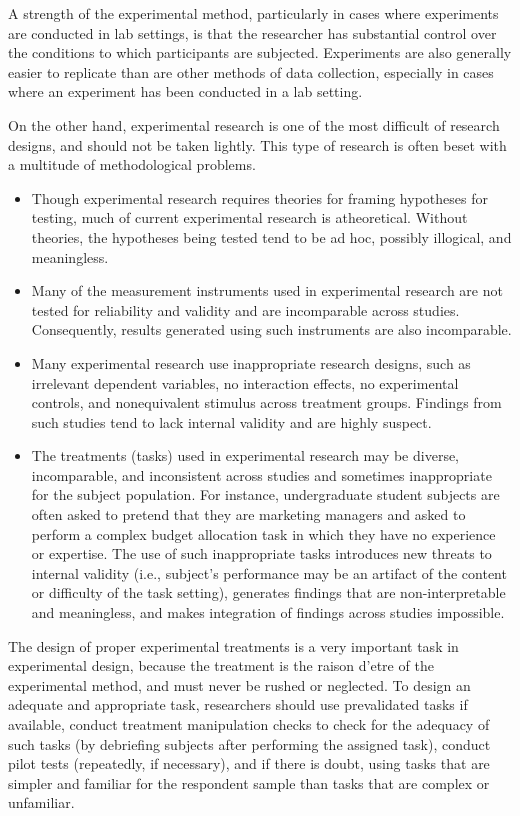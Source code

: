 A strength of the experimental method, particularly in cases where experiments are conducted in lab settings, is that the researcher has substantial control over the conditions to which participants are subjected. Experiments are also generally easier to replicate than are other methods of data collection, especially in cases where an experiment has been conducted in a lab setting.

On the other hand, experimental research is one of the most difficult of research designs, and should not be taken lightly. This type of research is often beset with a multitude of methodological problems. 

\begin{itemize}
	\item Though experimental research requires theories for framing hypotheses for testing, much of current experimental research is atheoretical. Without theories, the hypotheses being tested tend to be ad hoc, possibly illogical, and meaningless. 
	\item Many of the measurement instruments used in experimental research are not tested for reliability and validity and are incomparable across studies. Consequently, results generated using such instruments are also incomparable. 
	\item Many experimental research use inappropriate research designs, such as irrelevant dependent variables, no interaction effects, no experimental controls, and nonequivalent stimulus across treatment groups. Findings from such studies tend to lack internal validity and are highly suspect. 
	\item The treatments (tasks) used in experimental research may be diverse, incomparable, and inconsistent across studies and sometimes inappropriate for the subject population. For instance, undergraduate student subjects are often asked to pretend that they are marketing managers and asked to perform a complex budget allocation task in which they have no experience or expertise. The use of such inappropriate tasks introduces new threats to internal validity (i.e., subject's performance may be an artifact of the content or difficulty of the task setting), generates findings that are non-interpretable and meaningless, and makes integration of findings across studies impossible.
\end{itemize}

The design of proper experimental treatments is a very important task in experimental design, because the treatment is the raison d'etre of the experimental method, and must never be rushed or neglected. To design an adequate and appropriate task, researchers should use prevalidated tasks if available, conduct treatment manipulation checks to check for the adequacy of such tasks (by debriefing subjects after performing the assigned task), conduct pilot tests (repeatedly, if necessary), and if there is doubt, using tasks that are simpler and familiar for the respondent sample than tasks that are complex or unfamiliar.

